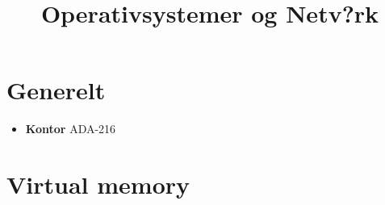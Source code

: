 \documentclass[11pt]{article}
\title{Operativsystemer og Netv?rk}
\providecommand{\tightlist}{%
      \setlength{\itemsep}{0pt}\setlength{\parskip}{0pt}}
\begin{document}
    
    
    \maketitle
    
    

    
    \section{Generelt}\label{generelt}

\begin{itemize}
\tightlist
\item
  \textbf{Kontor} ADA-216
\end{itemize}

    \section{Virtual memory}\label{virtual-memory}
\end{document}
